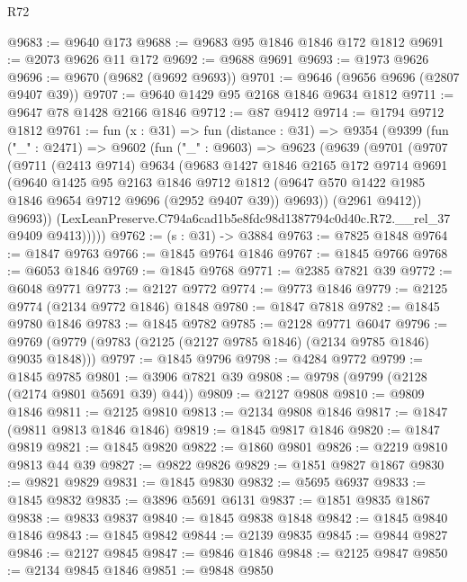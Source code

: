 \begin{lexlean}{R72}
\begin{coremodule}
@9683 := @9640 @173
@9688 := @9683 @95 @1846 @1846 @172 @1812
@9691 := @2073 @9626 @11 @172
@9692 := @9688 @9691
@9693 := @1973 @9626
@9696 := @9670 (@9682 (@9692 @9693))
@9701 := @9646 (@9656 @9696 (@2807 @9407 @39))
@9707 := @9640 @1429 @95 @2168 @1846 @9634 @1812
@9711 := @9647 @78 @1428 @2166 @1846
@9712 := @87 @9412
@9714 := @1794 @9712 @1812
@9761 := fun (x : @31) =>
  fun (distance : @31) =>
  @9354
    (@9399
      (fun ("_" : @2471) =>
      @9602
        (fun ("_" : @9603) =>
        @9623
          (@9639
            (@9701
              (@9707
                (@9711
                  (@2413 @9714)
                  @9634
                  (@9683
                    @1427
                    @1846
                    @2165
                    @172
                    @9714
                    @9691
                    (@9640
                      @1425
                      @95
                      @2163
                      @1846
                      @9712
                      @1812
                      (@9647 @570 @1422 @1985 @1846 @9654 @9712 @9696 (@2952 @9407 @39))
                      @9693))
                  (@2961 @9412))
                @9693))
            (LexLeanPreserve.C794a6cad1b5e8fdc98d1387794c0d40c.R72.__rel_37 @9409 @9413)))))
@9762 := (s : @31) -> @3884
@9763 := @7825 @1848
@9764 := @1847 @9763
@9766 := @1845 @9764 @1846
@9767 := @1845 @9766
@9768 := @6053 @1846
@9769 := @1845 @9768
@9771 := @2385 @7821 @39
@9772 := @6048 @9771
@9773 := @2127 @9772
@9774 := @9773 @1846
@9779 := @2125 @9774 (@2134 @9772 @1846) @1848
@9780 := @1847 @7818
@9782 := @1845 @9780 @1846
@9783 := @1845 @9782
@9785 := @2128 @9771 @6047
@9796 := @9769 (@9779 (@9783 (@2125 (@2127 @9785 @1846) (@2134 @9785 @1846) @9035 @1848)))
@9797 := @1845 @9796
@9798 := @4284 @9772
@9799 := @1845 @9785
@9801 := @3906 @7821 @39
@9808 := @9798 (@9799 (@2128 (@2174 @9801 @5691 @39) @44))
@9809 := @2127 @9808
@9810 := @9809 @1846
@9811 := @2125 @9810
@9813 := @2134 @9808 @1846
@9817 := @1847 (@9811 @9813 @1846 @1846)
@9819 := @1845 @9817 @1846
@9820 := @1847 @9819
@9821 := @1845 @9820
@9822 := @1860 @9801
@9826 := @2219 @9810 @9813 @44 @39
@9827 := @9822 @9826
@9829 := @1851 @9827 @1867
@9830 := @9821 @9829
@9831 := @1845 @9830
@9832 := @5695 @6937
@9833 := @1845 @9832
@9835 := @3896 @5691 @6131
@9837 := @1851 @9835 @1867
@9838 := @9833 @9837
@9840 := @1845 @9838 @1848
@9842 := @1845 @9840 @1846
@9843 := @1845 @9842
@9844 := @2139 @9835
@9845 := @9844 @9827
@9846 := @2127 @9845
@9847 := @9846 @1846
@9848 := @2125 @9847
@9850 := @2134 @9845 @1846
@9851 := @9848 @9850

\end{coremodule}
\end{lexlean}
